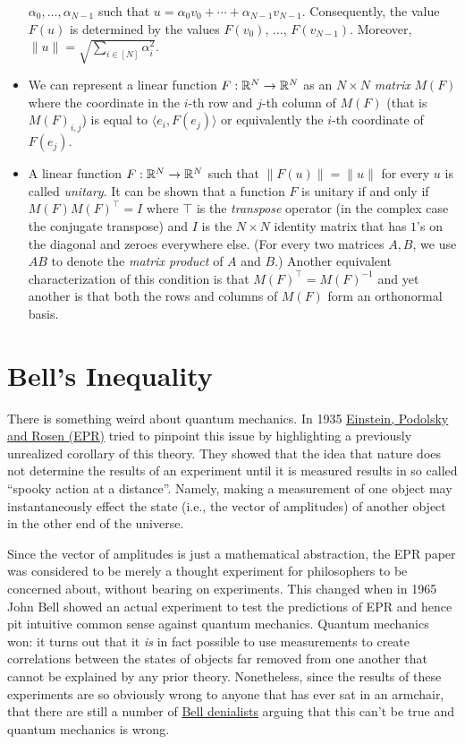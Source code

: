 \begin{itemize}
  \(\alpha_0,\ldots,\alpha_{N-1}\) such that
  \(u = \alpha_0v_0 + \cdots + \alpha_{N-1}v_{N-1}\). Consequently, the
  value \(F(u)\) is determined by the values \(F(v_0)\), \(\ldots\),
  \(F(v_{N-1})\). Moreover,
  \(\|u\| = \sqrt{\sum_{i\in [N]} \alpha_i^2}\).
\item
  We can represent a linear function \(F:{\mathbb{R}}^N \rightarrow {\mathbb{R}}^N\) as an
  \(N\times N\) \emph{matrix} \(M(F)\) where the coordinate in the
  \(i\)-th row and \(j\)-th column of \(M(F)\) (that is \(M(F)_{i,j}\))
  is equal to \(\langle e_i , F(e_j) \rangle\) or equivalently the
  \(i\)-th coordinate of \(F(e_j)\).
\item
  A linear function \(F:{\mathbb{R}}^N \rightarrow {\mathbb{R}}^N\) such that
  \(\| F(u) \| = \|u \|\) for every \(u\) is called \emph{unitary}. It
  can be shown that a function \(F\) is unitary if and only if
  \(M(F) M(F)^\top = I\) where \(\top\) is the \emph{transpose} operator
  (in the complex case the conjugate transpose) and \(I\) is the
  \(N\times N\) identity matrix that has \(1\)'s on the diagonal and
  zeroes everywhere else. (For every two matrices \(A,B\), we use
  \(A B\) to denote the \emph{matrix product} of \(A\) and \(B\).)
  Another equivalent characterization of this condition is that
  \(M(F)^\top = M(F)^{-1}\) and yet another is that both the rows and
  columns of \(M(F)\) form an orthonormal basis.
\end{itemize}

\section{Bell's Inequality}\label{bellineqsec}

There is something weird about quantum mechanics. In 1935
\href{http://plato.stanford.edu/entries/qt-epr/}{Einstein, Podolsky and
Rosen (EPR)} tried to pinpoint this issue by highlighting a previously
unrealized corollary of this theory. They showed that the idea that
nature does not determine the results of an experiment until it is
measured results in so called ``spooky action at a distance''. Namely,
making a measurement of one object may instantaneously effect the state
(i.e., the vector of amplitudes) of another object in the other end of
the universe.

Since the vector of amplitudes is just a mathematical abstraction, the
EPR paper was considered to be merely a thought experiment for
philosophers to be concerned about, without bearing on experiments. This
changed when in 1965 John Bell showed an actual experiment to test the
predictions of EPR and hence pit intuitive common sense against quantum
mechanics. Quantum mechanics won: it turns out that it \emph{is} in fact
possible to use measurements to create correlations between the states
of objects far removed from one another that cannot be explained by any
prior theory. Nonetheless, since the results of these experiments are so
obviously wrong to anyone that has ever sat in an armchair, that there
are still a number of
\href{http://www.scottaaronson.com/blog/?p=2464}{Bell denialists}
arguing that this can't be true and quantum mechanics is wrong.

